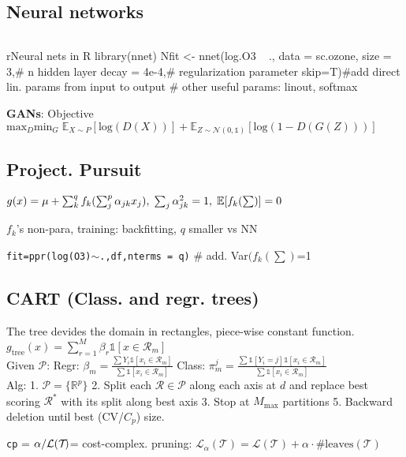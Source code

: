 \subsection*{Neural networks} $\; $
\begin{codebox}{r}{Neural nets in R}
library(nnet)
Nfit <- nnet(log.O3 ~ ., data = sc.ozone,
  size = 3,# n hidden layer
  decay = 4e-4,# regularization parameter
  skip=T)#add direct lin. params from input to output
  # other useful params: linout, softmax
\end{codebox}
\textbf{GANs}: Objective \\ $\text{max}_{D} \text{min}_G \; \mathbb{E}_{X \sim P}\left[\text{log}(D(X))\right] + \mathbb{E}_{Z \sim \mathcal{N}(0, \mathbb{1})}\left[\text{log}(1 - D(G(Z)))\right]$

\subsection*{Project. Pursuit} $g(x)=\mu+\sum^q_k f_k(\sum^p_j \alpha_{jk}x_j),\; \sum_j\alpha^2_{jk}=1,\; \mathbb{E}[f_k(\sum)]=0$

$f_k$'s non-para, training: backfitting, $q$ smaller vs NN

\texttt{fit=ppr(log(O3)$\sim$.,df,nterms = q)} \# add. Var$(f_k(\sum)$=1

\subsection*{CART (Class. and regr. trees)}
The tree devides the domain in rectangles, piece-wise constant function.
$g_{\text{tree}}(x)=\sum_{r=1}^M\beta_r \mathbb{1}[x\in\mathcal{R}_m]$\\
Given $\mathcal{P}$: Regr: $\beta_m=\frac{\sum Y_i\mathbb{1}[x_i\in\mathcal{R}_m]}{\sum\mathbb{1}[x_i\in\mathcal{R}_m]}$ Class: $\pi^j_m=\frac{\sum \mathbb{1}[Y_i=j]\mathbb{1}[x_i\in\mathcal{R}_m]}{\sum\mathbb{1}[x_i\in\mathcal{R}_m]}$ 
\\
Alg: 1. $\mathcal{P}=\{\mathbb{R}^p\}$ 2. Split each $\mathcal{R}\in\mathcal{P}$ along each axis at $d$ and replace best scoring $\mathcal{R}^*$ with its split along best axis 3. Stop at $M_{\max}$ partitions 5. Backward deletion until best (CV/$C_p$) size.

\texttt{cp} = $\alpha/\mathcal{L}(\mathcal{T}_{\empty})$= cost-complex. pruning: $\mathcal{L}_{\alpha}(\mathcal{T})=\mathcal{L}(\mathcal{T})+\alpha\cdot \#\text{leaves}(\mathcal{T})$

